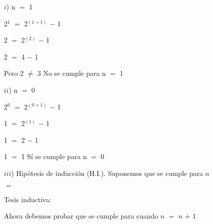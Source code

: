 \documentclass[12pt]{article}
\begin{document}
 
{\textcolor{verde_manzana}{$i$)  n $=$ 1}} \vspace{0.2cm}

\hspace{4cm} 2$^{1}$ $=$ 2$^{(1 + 1)}$ $-$ 1  \vspace{0.2cm}

\hspace{4.2cm} 2 $=$ 2$^{(2)}$ $-$ 1  \vspace{0.2cm}

\hspace{4.2cm} 2 $=$ 4 $-$ 1 \vspace{0.2cm}

\hspace{2cm} Pero \hspace{1cm} 2 $\neq$ 3 \hspace{0.2cm} No se cumple para n $=$ 1 \vspace{0.2cm}

{\textcolor{verde_manzana}{$ii$)  n $=$ 0}} \vspace{0.2cm}

\hspace{4cm} 2$^{0}$ $=$ 2$^{(0 + 1)}$ $-$ 1  \vspace{0.2cm}

\hspace{4.2cm} 1 $=$ 2$^{(1)}$ $-$ 1  \vspace{0.2cm}

\hspace{4.2cm} 1 $=$ 2 $-$ 1 \vspace{0.2cm}

\hspace{4.2cm} 1 $=$ 1 \hspace{0.2cm} Sí se cumple para n $=$ 0 \vspace{0.2cm}

{\textcolor{verde_manzana}{$iii$) Hipótesis de inducción (H.I.). }} Suponemos que se cumple para $n$\vspace{0.2cm} 
 
\hspace{4cm} {} $=$  {} \vspace{0.2cm}
 
{\textcolor{verde_manzana}{Tesis inductiva:}}  \vspace{0.2cm}
 
Ahora debemos probar que se cumple para cuando $n$ $=$ $n$ $+$ $1$ \vspace{0.2cm}
 
\end{document}

